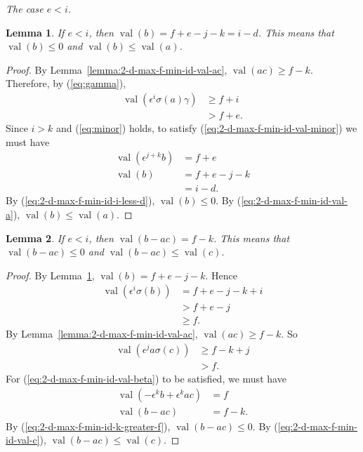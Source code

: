 \documentclass{amsart}
\newtheorem{lemma}{Lemma}[subsection]
\theoremstyle{definition}
\def\e{\epsilon}
\def\val{\mathop{\mathrm{val}}}
\def\s{\sigma}
\newcommand\subsubsubsection[1]{\vspace{0.5em}\begin{paragraph}{}\noindent \normalfont\large\itshape #1. \end{paragraph}\vspace{0.5em}}
\begin{document}
  \subsubsubsection{The case $e < i$}
  \begin{lemma}
    \label{lemma:2-d-max-f-min-id-e-l-i-val-b}
    If $e < i$, then $\val(b) = f + e - j - k = i - d$.  This means that
    $\val(b) \le 0$ and $\val(b) \le \val(a)$.
  \end{lemma}
  \begin{proof}
    By Lemma~\ref{lemma:2-d-max-f-min-id-val-ac}, $\val(ac) \ge f -k$.
    Therefore, by (\ref{eq:gamma}),
    \begin{align*}
      \val(\e^i\s(a)\gamma) &\ge f + i \\
       &> f + e.
    \end{align*}
    Since $i > k$ and (\ref{eq:minor}) holds, to satisfy
    (\ref{eq:2-d-max-f-min-id-val-minor}) we must have
    \begin{align*}
      \val(\e^{j+k} b) &= f + e \\
      \val(b) &= f + e - j - k \\
      &= i - d.
    \end{align*}
    By (\ref{eq:2-d-max-f-min-id-i-less-d}), $\val(b) \le 0$.  By
    (\ref{eq:2-d-max-f-min-id-val-a}), $\val(b) \le \val(a)$.
  \end{proof}

  \begin{lemma}
    If $e < i$, then $\val(b-ac) = f -k$.  This means that $\val(b-ac) \le 0$
    and $\val(b-ac) \le \val(c)$.
  \end{lemma}
  \begin{proof}
    By Lemma~\ref{lemma:2-d-max-f-min-id-e-l-i-val-b}, $\val(b) = f + e - j -
    k$.  Hence
    \begin{align*}
      \val(\e^i \s(b)) &= f + e - j - k + i \\
      &> f + e - j \\
      &\ge f.
    \end{align*}
    By Lemma~\ref{lemma:2-d-max-f-min-id-val-ac}, $\val(ac) \ge f-k$.  So
    \begin{align*}
      \val(\e^j a \s(c)) &\ge f - k + j \\
      &> f.
    \end{align*}
    For (\ref{eq:2-d-max-f-min-id-val-beta}) to be satisfied, we must have
    \begin{align*}
      \val(-\e^k b + \e^k ac) &= f\\
      \val(b - ac) &= f-k.
    \end{align*}
    By (\ref{eq:2-d-max-f-min-id-k-greater-f}), $\val(b-ac) \le 0$.  By
    (\ref{eq:2-d-max-f-min-id-val-c}), $\val(b-ac) \le \val(c)$.
  \end{proof}
\end{document}
